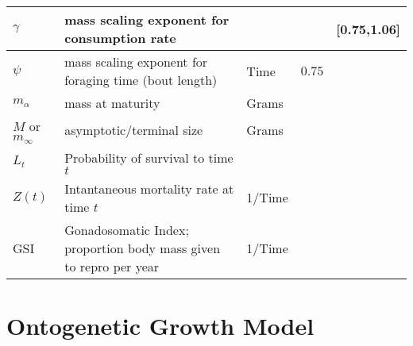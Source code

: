\documentclass[a4paper]{article} %
\begin{document}
\begin{table}[H]
\begin{tabularx}{\linewidth}{|l|X|l|X|l|}
    $\gamma$            & mass scaling exponent for consumption rate                        &                           &                                               & [0.75,1.06]   \\ \hline
    $\psi$              & mass scaling exponent for foraging time (bout length)             & Time                      & $0.75$                                        &               \\ \hline
    $m_{\alpha}$        & mass at maturity                                                  & Grams                     &                                               &               \\ \hline
    $M$ or $m_{\infty}$ & asymptotic/terminal size                                          & Grams                     &                                               &               \\ \hline
    $L_t$               & Probability of survival to time $t$                               &                           &                                               &               \\ \hline
    $Z(t)$              & Intantaneous mortality rate at time $t$                           & 1/Time                    &                                               &               \\ \hline
    GSI                 & Gonadosomatic Index; proportion body mass given to repro per year & 1/Time                    &                                               &               \\ \hline
\end{tabularx}
\end{table}
\newpage

\section{Ontogenetic Growth Model}
\end{document}
